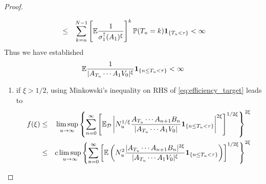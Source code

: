 \documentclass{article}
\begin{document}
\begin{proof}
\begin{enumerate}
\begin{eqnarray*}
      &\leq& \sum_{k=n}^{N-1} \left[
        \mathbb{E} {1 \over
          \sigma^{\uparrow}_1(A_1)^\xi          
        }
      \right]^k \mathbb{P}(T_u = k) \mathbf{1}_{\{T_u < \tau\}} < \infty
    \end{eqnarray*}
    Thus we have established
    \[
    \mathbb{E} {1 \over |A_{T_u} \cdots A_1 V_0|^\xi}\mathbf{1}_{\{n \leq T_u < \tau\}} < \infty
    \]
    \begin{enumerate}
    \item if $\xi > 1/2$, using Minkowski's inequality on RHS of
      \eqref{eq:efficiency_target} leads to
      \begin{eqnarray*}
        f(\xi) &\leq& \limsup_{u \to \infty}
        \left\{
          \sum_{n=0}^{\infty}
          \left[
            \mathbb{E}_{\mathcal D} \left|
              N_u^{1/\xi}
              \frac{
                A_{T_u} \cdots A_{n+1} B_n 
              }{
                |A_{T_u} \cdots A_1 V_0|
              }
              \mathbf{1}_{\{n \leq T_u < \tau\}}
            \right|^{2 \xi}
          \right]^{1/2\xi}
        \right\}^{2\xi} \\
        &\leq& c \limsup_{u \to \infty}
        \left\{
          \sum_{n=0}^{\infty}
          \left[
            \mathbb{E} \left(
              N_u^2
              \frac{
                |A_{T_u} \cdots A_{n+1} B_n|^{2\xi}
              }{
                |A_{T_u} \cdots A_1 V_0|^\xi
              }
              \mathbf{1}_{\{n \leq T_u < \tau\}}
            \right)
          \right]^{1/2\xi}
        \right\}^{2\xi}
      \end{eqnarray*}
    \end{enumerate}
  \end{enumerate}
\end{proof}




\end{document}
